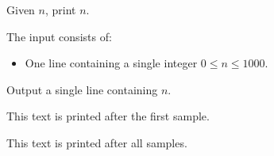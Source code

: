 \problemname{}

\newcommand{\maxn}{1000}

Given $n$, print $n$.

\begin{Input}
    The input consists of:
    \begin{itemize}
        \item One line containing a single integer $0\leq n\leq \maxn$.
    \end{itemize}
\end{Input}

\begin{Output}
    Output a single line containing $n$.
\end{Output}

\nextsample{}
This text is printed after the first sample.

\remainingsamples{}
This text is printed after all samples.
